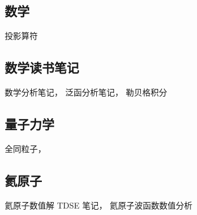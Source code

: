 
\subsection{数学}
投影算符

\subsection{数学读书笔记}
数学分析笔记， 泛函分析笔记， 勒贝格积分

\subsection{量子力学}
全同粒子， 

\subsection{氦原子}
氦原子数值解 TDSE 笔记， 氦原子波函数数值分析
